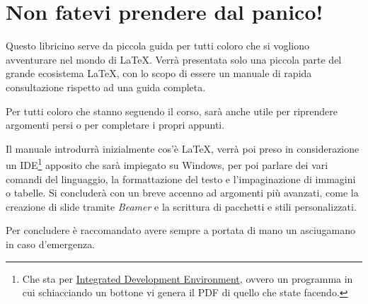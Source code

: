 \chapter*{Non fatevi prendere dal panico!}

Questo libricino serve da piccola guida per tutti coloro che si vogliono 
avventurare nel mondo di \LaTeX. Verrà presentata solo una piccola parte del 
grande ecosistema \LaTeX, con lo scopo di essere un manuale di rapida 
consultazione rispetto ad una guida completa.

Per tutti coloro che stanno seguendo il corso, sarà anche utile per riprendere 
argomenti persi o per completare i propri appunti.

Il manuale introdurrà inizialmente cos'è \LaTeX{}, verrà poi preso in 
considerazione un IDE\footnote{Che sta per 
\href{https://it.wikipedia.org/wiki/Integrated_development_environment}{ 
Integrated Development Environment}, ovvero un programma in cui schiacciando 
un bottone vi genera il PDF di quello che state facendo.} apposito che sarà 
impiegato su Windows, per poi parlare dei vari comandi del linguaggio, la 
formattazione del testo e l'impaginazione di immagini o tabelle. Si concluderà 
con un breve accenno ad argomenti più avanzati, come la creazione di slide 
tramite \textit{Beamer} e la scrittura di pacchetti e stili personalizzati.

Per concludere è raccomandato avere sempre a portata di mano un asciugamano in 
caso d'emergenza.